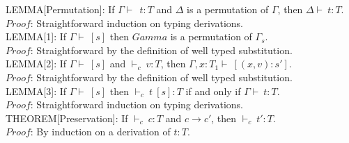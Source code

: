 \documentclass {article}
\newcommand{\tto}{\longrightarrow}
\newcommand{\subx}{[(x,v):s']}
\newcommand{\env}{{\Gamma \vdash \ }}
\newcommand{\envE}{{\Gamma , x:T_1 \vdash \ }}
\newcommand{\tyC}{{\vdash_c \ }}
\begin{document}
LEMMA[Permutation]: If $\env \ t : T$ and $\Delta$ is a permutation of $\Gamma$, then $\Delta \vdash \ t : T$.\\
$Proof$: Straightforward induction on typing derivations.\ \\

LEMMA[1]: If $\env [s]$ then $Gamma$ is a permutation of $\Gamma_s$.\\
$Proof$: Straightforward by the definition of well typed substitution.\ \\

LEMMA[2]: If $\env [s]$ and $\tyC v : T$, then $\envE \subx$. \\
$Proof$: Straightforward by the definition of well typed substitution.\ \\

LEMMA[3]: If $\env [s]$ then $\tyC t \ [s] : T$ if and only if $\env t :T$. \\
$Proof$: Straightforward induction on typing derivations.\ \\

THEOREM[Preservation]: If $\tyC c : T$ and $c \tto c'$, then $\tyC t' : T$.\\
$Proof$: By induction on a derivation of $t : T$.
\end{document}

